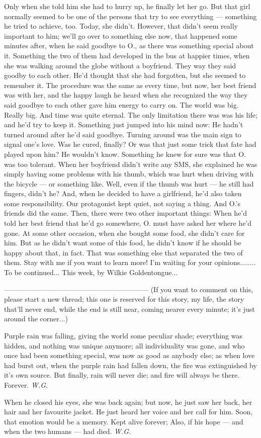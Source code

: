 Only when she told him she had to hurry up, he finally let her go. 
But that girl normally seemed to be one of the persons that try to see everything --- something he tried to achieve, too. 
Today, she didn't. 
However, that didn't seem really important to him; we'll go over to something else now, that happened some minutes after, when he said goodbye to O., as there was something special about it. 
Something the two of them had developed in the bus at happier times, when she was walking around the globe without a boyfriend. 
They way they said goodby to each other. 
He'd thought that she had forgotten, but she seemed to remember it. 
The procedure was the same as every time, but now, her best friend was with her, and the happy laugh he heard when she recognized the way they said goodbye to each other gave him energy to carry on. 
The world was big. 
Really big. 
And time was quite eternal. 
The only limitation there was was his life; and he'd try to keep it. 
Something just jumped into his mind now: He hadn't turned around after he'd said goodbye. 
Turning around was the main sign to signal one's love. 
Was he cured, finally?
Or was that just some trick that fate had played upon him?
He wouldn't know. 
Something he knew for sure was that O. was too tolerant. 
When her boyfriend didn't write any SMS, she explained he was simply having some problems with his thumb, which was hurt when driving with the bicycle --- or something like. 
Well, even if the thumb was hurt --- he still had fingers, didn't he?
And, when he decided to have a girlfriend, he'd also taken some responsibility. 
Our protagonist kept quiet, not saying a thing. 
And O.'s friends did the same. 
Then, there were two other important things: When he'd told her best friend that he'd go somewhere, O. must have asked her where he'd gone. 
At some other occasion, when she bought some food, she didn't care for him. 
But as he didn't want some of this food, he didn't know if he should be happy about that, in fact. 
That was something else that separated the two of them. 
Stay with me if you want to learn more!
I'm waiting for your opinions........
To be continued...
This week, by Wilkie Goldentongue...

--------------------------------------------------------------
(If you want to comment on this, please start a new thread; this one is reserved for this story, my life, the story that'll never end, while the end is still near, coming nearer every minute; it's just around the corner...)

Purple rain was falling, 
giving the world some peculiar shade; 
everything was hidden, 
and nothing was unique anymore; 
all individuality was gone, 
and who once had been something special, 
was now as good as anybody else;
as when love had burst out, 
when the purple rain had fallen down, 
the fire was extinguished 
by it's own source. 
But finally, rain will never die; 
and fire will always be there. 
Forever. 
\emph{W.G.}

When he closed his eyes, 
she was back again; 
but now, he just saw her back, 
her hair and her favourite jacket. 
He just heard her voice 
and her call for him. 
Soon, 
that emotion 
would be a memory. 
Kept alive forever; 
Also, if his hope --- 
and when the two humans --- 
had died. 
\emph{W.G.}
